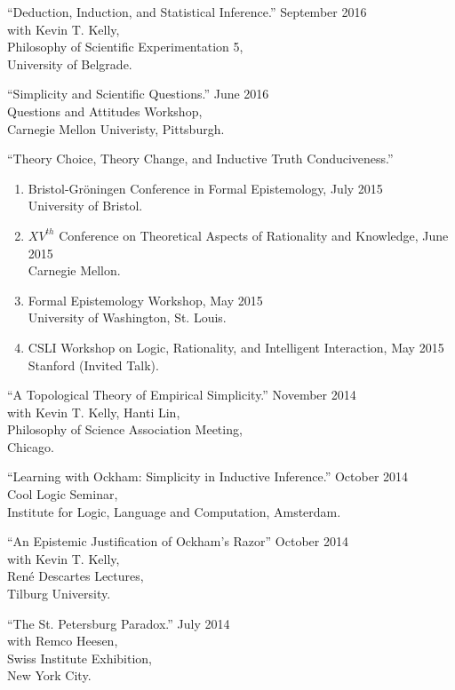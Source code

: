 \documentclass[12pt]{res} %
\begin{document}
\begin{resume}
``Deduction, Induction, and Statistical Inference.'' \hfill September 2016\\
with Kevin T. Kelly,\\
Philosophy of Scientific Experimentation 5,\\
University of Belgrade.

``Simplicity and Scientific Questions.'' \hfill June 2016\\ 
Questions and Attitudes Workshop,\\
Carnegie Mellon Univeristy, Pittsburgh.

``Theory Choice, Theory Change, and Inductive Truth Conduciveness.''\\
\begin{enumerate}
\item Bristol-Gr\"{o}ningen Conference in Formal Epistemology, \hfill July 2015 \\University of Bristol. 
\item $XV^{th}$ Conference on Theoretical Aspects of Rationality and Knowledge, \hfill June 2015\\ Carnegie Mellon. 
\item Formal Epistemology Workshop, \hfill May 2015\\ University of Washington, St. Louis. 
\item CSLI Workshop on Logic, Rationality, and Intelligent Interaction, \hfill May 2015\\ Stanford (Invited Talk). 
\end{enumerate}

``A Topological Theory of Empirical Simplicity.'' \hfill November 2014\\
with Kevin T. Kelly, Hanti Lin,\\
Philosophy of Science Association Meeting,\\
Chicago.

``Learning with Ockham: Simplicity in Inductive Inference.'' \hfill October 2014\\
Cool Logic Seminar,\\ 
Institute for Logic, Language and Computation, Amsterdam.

``An Epistemic Justification of Ockham's Razor'' \hfill October 2014\\ with Kevin T. Kelly,\\ Ren\'{e} Descartes Lectures,\\
Tilburg University.

``The St. Petersburg Paradox.'' \hfill July 2014\\
with Remco Heesen,\\
Swiss Institute Exhibition,\\ 
New York City. 



\end{resume}
\end{document}
